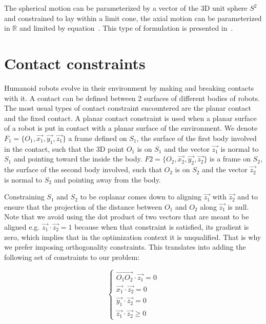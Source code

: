 The spherical motion can be parameterized by a vector of the 3D unit sphere $S^2$ and constrained to lay within a limit cone, the axial motion can be parameterized in $\mathbb{R}$ and limited by equation~.
This type of formulation is presented in~\cite{baerlocher}.



\section{Contact constraints}
\label{sec:contact_constraints}


Humanoid robots evolve in their environment by making and breaking contacts with it.
A contact can be defined between 2 surfaces of different bodies of robots.
The most usual types of contact constraint encountered are the planar contact and the fixed contact.
A planar contact constraint is used when a planar surface of a robot is put in contact with a planar surface of the environment.
We denote $F_1 = \{O_1, \vec{x_1}, \vec{y_1}, \vec{z_1}\}$ a frame defined on $S_1$, the surface of the first body involved in the contact, such that the 3D point $O_1$ is on $S_1$ and the vector $\vec{z_1}$ is normal to $S_1$ and pointing toward the inside the body.
$F2 = \{O_2, \vec{x_2}, \vec{y_2}, \vec{z_2}\}$ is a frame on $S_2$, the surface of the second body involved, such that $O_2$ is on $S_2$ and the vector $\vec{z_2}$ is normal to $S_2$ and pointing away from the body.

Constraining $S_1$ and $S_2$ to be coplanar comes down to aligning $\vec{z_1}$ with $\vec{z_2}$ and to ensure that the projection of the distance between $O_1$ and $O_2$ along $\vec{z_1}$ is null.
Note that we avoid using the dot product of two vectors that are meant to be aligned e.g. $\vec{z_1}\cdot\vec{z_2} = 1$ because when that constraint is satisfied, its gradient is zero, which implies that in the optimization context it is unqualified.
That is why we prefer imposing orthogonality constraints.
This translates into adding the following set of constraints to our problem:

\begin{equation}
\label{eq:coplanarity}
\boxed{\left\{
  \begin{array}{l}
    \overrightarrow{O_1O_2} \cdot \vec{z_1} = 0\\
    \vec{x_1}\cdot\vec{z_2} = 0\\
    \vec{y_1}\cdot\vec{z_2} = 0\\
    \vec{z_1}\cdot\vec{z_2} \geq 0
  \end{array}
  \right.}
\end{equation}

